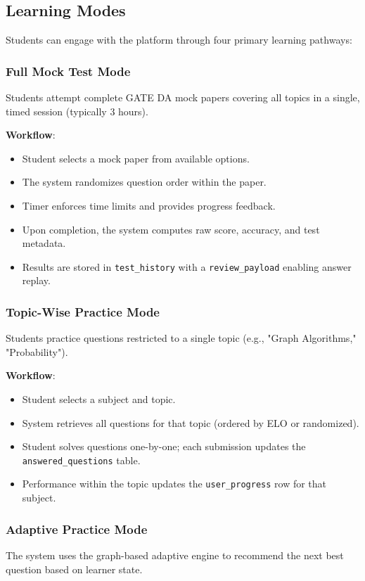 \documentclass[sigconf,authordraft,twoside]{acmart}
\newcommand{\tech}[1]{\textcolor{brandblue}{\nolinkurl{#1}}}
\begin{document}
\subsection{Learning Modes}
Students can engage with the platform through four primary learning pathways:

\subsubsection{Full Mock Test Mode}
Students attempt complete GATE DA mock papers covering all topics in a single, timed session (typically 3 hours).

\textbf{Workflow}:
\begin{itemize}
\item Student selects a mock paper from available options.
\item The system randomizes question order within the paper.
\item Timer enforces time limits and provides progress feedback.
\item Upon completion, the system computes raw score, accuracy, and test metadata.
\item Results are stored in \tech{test\_history} with a \tech{review\_payload} enabling answer replay.
\end{itemize}

\subsubsection{Topic-Wise Practice Mode}
Students practice questions restricted to a single topic (e.g., "Graph Algorithms," "Probability").

\textbf{Workflow}:
\begin{itemize}
\item Student selects a subject and topic.
\item System retrieves all questions for that topic (ordered by ELO or randomized).
\item Student solves questions one-by-one; each submission updates the \tech{answered\_questions} table.
\item Performance within the topic updates the \tech{user\_progress} row for that subject.
\end{itemize}

\subsubsection{Adaptive Practice Mode}
The system uses the graph-based adaptive engine to recommend the next best question based on learner state.
\end{document}
